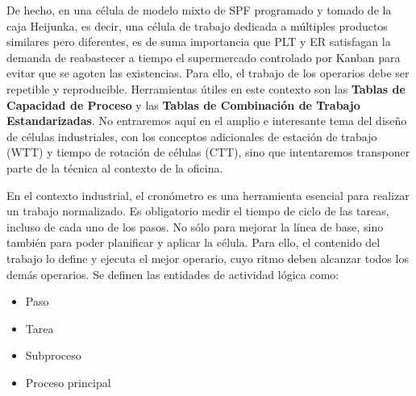 De hecho, en una célula de modelo mixto de SPF programado y tomado de la caja Heijunka, es decir, una célula de trabajo dedicada a múltiples productos similares pero diferentes, es de suma importancia que PLT y ER satisfagan la demanda de reabastecer a tiempo el supermercado controlado por Kanban para evitar que se agoten las existencias.
Para ello, el trabajo de los operarios debe ser repetible y reproducible.
Herramientas útiles en este contexto son las \textbf{Tablas de Capacidad de Proceso} y las \textbf{Tablas de Combinación de Trabajo Estandarizadas}. No entraremos aquí en el amplio e interesante tema del diseño de células industriales, con los conceptos adicionales de estación de trabajo (WTT) y tiempo de rotación de células (CTT), sino que intentaremos transponer parte de la técnica al contexto de la oficina.

En el contexto industrial, el cronómetro es una herramienta esencial para realizar un trabajo normalizado. Es obligatorio medir el tiempo de ciclo de las tareas, incluso de cada uno de los pasos. No sólo para mejorar la línea de base, sino también para poder planificar y aplicar la célula. Para ello, el contenido del trabajo lo define y ejecuta el mejor operario, cuyo ritmo deben alcanzar todos los demás operarios. Se definen las entidades de actividad lógica como:

\begin{itemize}
    \item Paso
    \item Tarea
    \item Subproceso
    \item Proceso principal
\end{itemize}

